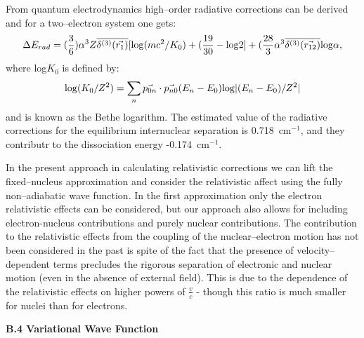 {{From quantum electrodynamics high--order radiative corrections can 
be derived and for a two--electron system one gets:\cite{k15}
\begin{equation}
\Delta E_{rad} = (\frac{3}{6})
\alpha^3 Z \overline{\delta^{(3)} (\vec{r_1})}
[{\rm log}(mc^2/K_0) + (\frac{19}{30} - {\rm log}2]
+ (\frac{28}{3} \alpha^3 \overline{\delta^{(3)}(\vec{r_{12}})}
{\rm log} \alpha,
\end{equation}
where log$K_0$ is defined by:
\begin{equation}
[\sum_{n} \vec{p_{0n}} \cdot \vec{p_{n0}}(E_n - E_0)]
{\rm log} (K_0 / Z^2) =
\sum_n \vec{p_{0n}} \cdot \vec{p_{n0}} 
(E_n - E_0) {\rm log} |(E_n - E_0)/Z^2|
\end{equation}
and is known as the Bethe logarithm. 
The estimated value of the radiative corrections for the 
equilibrium internuclear separation is 0.718~cm$^{-1}$,
and they contributr to the dissociation energy -0.174~cm$^{-1}$.
\cite{kk}

In the present approach in calculating relativistic 
corrections we can lift the fixed--nucleus approximation
and consider the relativistic affect using
the fully non--adiabatic wave function. 
In the first approximation only the electron 
relativistic effects can be considered, but our
approach also allows for including electron-nucleus
contributions and purely nuclear contributions.
The contribution to the relativistic effects from
the coupling of the nuclear--electron motion has not been
considered in the past is spite of the fact that the
presence of velocity--dependent terms
precludes the rigorous separation of electronic
and nuclear motion (even in the absence of external field).
This is due to the dependence of the relativistic
effects on higher powers of $\frac{v}{c}$ - though
this ratio is much smaller for nuclei than for
electrons. 




\vspace{2mm}
\noindent
{\bf B.4 Variational Wave Function}


}}

